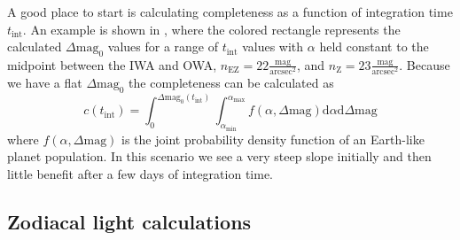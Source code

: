 A good place to start is calculating completeness
as a function of integration time $t_\textrm{int}$. An example
is shown in , where the colored rectangle
represents the calculated $\Delta\textrm{mag}_0$ values for a range of
$t_\textrm{int}$ values with $\alpha$ held constant to the midpoint between
the IWA and OWA, $n_\textrm{EZ}=22 \frac{\textrm{mag}}{\textrm{arcsec}^2}$, and
$n_\textrm{Z}=23 \frac{\textrm{mag}}{\textrm{arcsec}^2}$. Because we have a
flat $\Delta\textrm{mag}_0$ the completeness can be calculated as
\begin{equation}
  c(t_\textrm{int}) = \int_{0}^{\Delta\textrm{mag}_0(t_\textrm{int})} 
  \int_{\alpha_\textrm{min}}^{\alpha_\textrm{max}} 
  f(\alpha, \Delta\textrm{mag})\textrm{d}\alpha \textrm{d}\Delta\textrm{mag}
  \label{eq:flat_comp_integral}
\end{equation}
where $f(\alpha, \Delta\textrm{mag})$ is the joint probability density function 
of an Earth-like planet population. In this scenario we see a very steep slope
initially and then little benefit after a few days of integration time.




\subsection{Zodiacal light calculations}
\label{sub:zodi}


